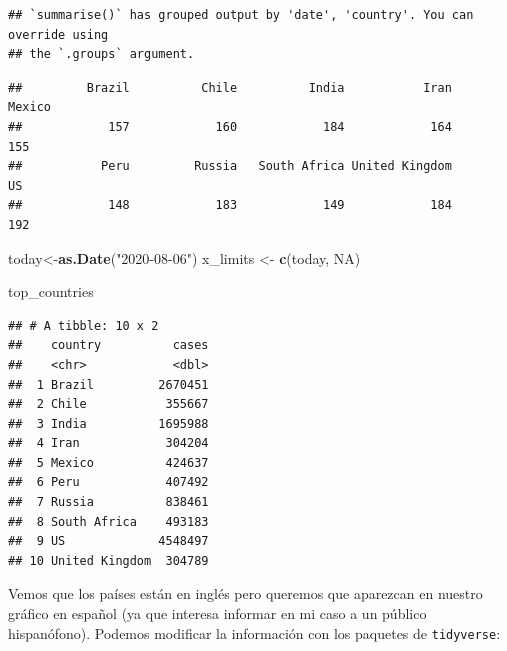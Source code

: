 \documentclass[
]{article}
\newenvironment{Shaded}{\begin{snugshade}}{\end{snugshade}}
\newcommand{\ConstantTok}[1]{\textcolor[rgb]{0.56,0.35,0.01}{#1}}
\newcommand{\FunctionTok}[1]{\textcolor[rgb]{0.13,0.29,0.53}{\textbf{#1}}}
\newcommand{\NormalTok}[1]{#1}
\newcommand{\OtherTok}[1]{\textcolor[rgb]{0.56,0.35,0.01}{#1}}
\newcommand{\SpecialCharTok}[1]{\textcolor[rgb]{0.81,0.36,0.00}{\textbf{#1}}}
\newcommand{\StringTok}[1]{\textcolor[rgb]{0.31,0.60,0.02}{#1}}
\begin{document}
\begin{verbatim}
## `summarise()` has grouped output by 'date', 'country'. You can override using
## the `.groups` argument.
\end{verbatim}

\begin{Shaded}
\end{Shaded}

\begin{verbatim}
##         Brazil          Chile          India           Iran         Mexico 
##            157            160            184            164            155 
##           Peru         Russia   South Africa United Kingdom             US 
##            148            183            149            184            192
\end{verbatim}

\begin{Shaded}
\begin{Highlighting}[]
\NormalTok{today}\OtherTok{\textless{}{-}}\FunctionTok{as.Date}\NormalTok{(}\StringTok{"2020{-}08{-}06"}\NormalTok{)}
\NormalTok{x\_limits }\OtherTok{\textless{}{-}} \FunctionTok{c}\NormalTok{(today, }\ConstantTok{NA}\NormalTok{)}

\NormalTok{top\_countries}
\end{Highlighting}
\end{Shaded}

\begin{verbatim}
## # A tibble: 10 x 2
##    country          cases
##    <chr>            <dbl>
##  1 Brazil         2670451
##  2 Chile           355667
##  3 India          1695988
##  4 Iran            304204
##  5 Mexico          424637
##  6 Peru            407492
##  7 Russia          838461
##  8 South Africa    493183
##  9 US             4548497
## 10 United Kingdom  304789
\end{verbatim}

Vemos que los países están en inglés pero queremos que aparezcan en
nuestro gráfico en español (ya que interesa informar en mi caso a un
público hispanófono). Podemos modificar la información con los paquetes
de \texttt{tidyverse}:
\end{document}
